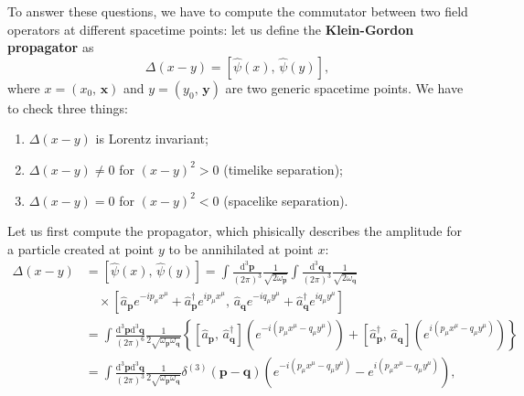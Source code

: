 To answer these questions, we have to compute the commutator between two field operators at different spacetime points: let us define the \textbf{Klein-Gordon propagator} as
\[
    \Delta(x-y) = \left[\hat{\psi}(x),\, \hat{\psi}(y)\right],
\]
where \(x = (x_0,\, \mathbf{x})\) and \(y = (y_0,\, \mathbf{y})\) are two generic spacetime points. We have to check three things:
\begin{enumerate}
    \item \(\Delta(x-y)\) is Lorentz invariant;
    \item \(\Delta(x-y) \neq 0\) for \((x-y)^2 > 0\) (timelike separation);
    \item \(\Delta(x-y) = 0\) for \((x-y)^2 < 0\) (spacelike separation).
\end{enumerate}
Let us first compute the propagator, which phisically describes the amplitude for a particle created at point \(y\) to be annihilated at point \(x\):
\[
    \begin{aligned}
        \Delta(x-y) & = \left[\hat{\psi}(x),\, \hat{\psi}(y)\right] = \int \frac{\mathrm{d}^3 \mathbf{p}}{(2\pi)^3} \frac{1}{\sqrt{2\omega_{\mathbf{p}}}} \int \frac{\mathrm{d}^3 \mathbf{q}}{(2\pi)^3} \frac{1}{\sqrt{2\omega_{\mathbf{q}}}}                                                                                                                                                 \\
                    & \quad \times \left[ \hat{a}_{\mathbf{p}} e^{-i p_{\mu} x^{\mu}} + \hat{a}^{\dagger}_{\mathbf{p}} e^{i p_{\mu} x^{\mu}},\, \hat{a}_{\mathbf{q}} e^{-i q_{\mu} y^{\mu}} + \hat{a}^{\dagger}_{\mathbf{q}} e^{i q_{\mu} y^{\mu}} \right]                                                                                                                                    \\
                    & = \int \frac{\mathrm{d}^3 \mathbf{p}\mathrm{d}^3 \mathbf{q}}{(2\pi)^6} \frac{1}{2\sqrt{\omega_{\mathbf{p}} \omega_{\mathbf{q}}}} \left\{ [\hat{a}_\mathbf{p} ,\, \hat{a}^{\dagger}_\mathbf{q}]\left( e^{-i(p_{\mu}x^{\mu} - q_{\mu}y^{\mu})}\right) + [\hat{a}^{\dagger}_\mathbf{p} ,\, \hat{a}_\mathbf{q}]\left( e^{i(p_{\mu}x^{\mu} - q_{\mu}y^{\mu})}\right)\right\} \\
                    & = \int \frac{\mathrm{d}^3 \mathbf{p}\mathrm{d}^3 \mathbf{q}}{(2\pi)^3} \frac{1}{2\sqrt{\omega_{\mathbf{p}} \omega_{\mathbf{q}}}} \delta^{(3)}(\mathbf{p}-\mathbf{q}) \left(e^{-i(p_{\mu}x^{\mu} - q_{\mu}y^{\mu})} - e^{i(p_{\mu}x^{\mu} - q_{\mu}y^{\mu})}\right),
    \end{aligned}
\]
